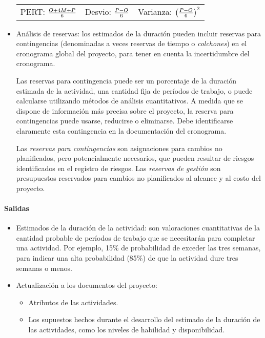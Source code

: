 \documentclass[a4paper,twosides]{article}
\newlength{\wideitemsep}
\let\olditem\item
\renewcommand{\item}{\setlength{\itemsep}{\wideitemsep}\olditem}
\begin{document}
\begin{itemize}
\begin{center}
\begin{tabular}{ccc}
PERT: ${O+4M+P}\over 6$ & Desvio: ${P-O} \over 6$ & Varianza: ${\left({P-O} \over 6 \right)}^2$
\end{tabular}
\end{center}
\item Análisis de reservas: los estimados de la duración pueden incluir reservas para contingencias (denominadas a veces reservas de tiempo o \emph{colchones}) en el cronograma global del proyecto, para tener en cuenta la incertidumbre del cronograma.
\par Las reservas para contingencia puede ser un porcentaje de la duración estimada de la actividad, una cantidad fija de períodos de trabajo, o puede calcularse utilizando métodos de análisis cuantitativos. A medida que se dispone de información más precisa sobre el proyecto, la reserva para contingencias puede usarse, reducirse o eliminarse. Debe identificarse claramente esta contingencia en la documentación del cronograma.
\par Las \emph{reservas para contingencias} son asignaciones para cambios no planificados, pero potencialmente necesarios, que pueden resultar de riesgos identificados en el registro de riesgos. Las \emph{reservas de gestión} son presupuestos reservados para cambios no planificados al alcance y al costo del proyecto.
\end{itemize}

\paragraph{Salidas}
\begin{itemize}
\item Estimados de la duración de la actividad: son valoraciones cuantitativas de la cantidad probable de períodos de trabajo que se necesitarán para completar una actividad. Por ejemplo, 15\% de probabilidad de exceder las tres semanas, para indicar una alta probabilidad (85\%) de que la actividad dure tres semanas o menos.
\item Actualización a los documentos del proyecto:
\begin{itemize}
\item Atributos de las actividades.
\item Los supuestos hechos durante el desarrollo del estimado de la duración de las actividades, como los niveles de habilidad y disponibilidad.
\end{itemize}
\end{itemize}
\end{document}
